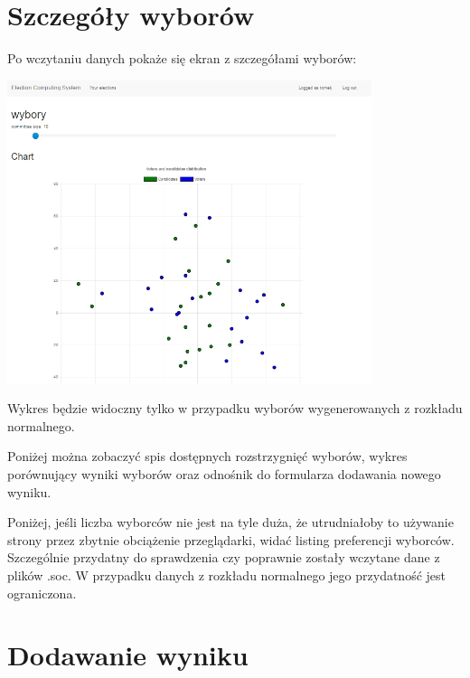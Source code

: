 \documentclass[pdflatex,11pt]{../aghdoc_version2}
\begin{document}
\newpage
\section{Szczegóły wyborów}
\label{sec:szczegolywyborow}

Po wczytaniu danych pokaże się ekran z szczegółami wyborów: \\
\begin{center}
\includegraphics[width=0.8\textwidth]{pics/newlycreated_version2.png}
\end{center}

\vspace{\baselineskip}
Wykres będzie widoczny tylko w przypadku wyborów wygenerowanych z rozkładu normalnego.

Poniżej można zobaczyć spis dostępnych rozstrzygnięć wyborów, wykres porównujący wyniki wyborów oraz odnośnik do formularza dodawania nowego wyniku.

Poniżej, jeśli liczba wyborców nie jest na tyle duża, że utrudniałoby to używanie strony przez zbytnie obciążenie przeglądarki, widać listing preferencji wyborców. Szczególnie przydatny do sprawdzenia czy poprawnie zostały wczytane dane z plików .soc. W przypadku danych z rozkładu normalnego jego przydatność jest ograniczona.

\newpage
\section{Dodawanie wyniku}
\label{sec:dodawaniewyniku}
\end{document}
